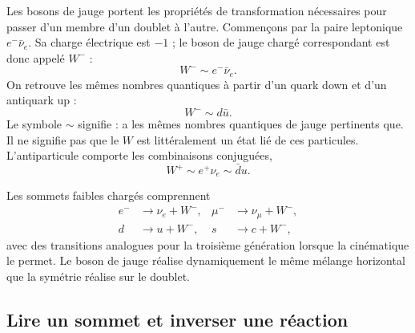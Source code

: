 Les bosons de jauge portent les propriétés de transformation nécessaires pour passer d’un membre d’un doublet à l’autre. Commençons par la paire leptonique \(e^-\bar\nu_e\). Sa charge électrique est \(-1\) ; le boson de jauge chargé correspondant est donc appelé \(W^-\) :
\begin{equation}
W^-\sim e^-\bar\nu_e.
\end{equation}
On retrouve les mêmes nombres quantiques à partir d’un quark down et d’un antiquark up :
\begin{equation}
W^-\sim d\bar u.
\end{equation}
Le symbole \(\sim\) signifie : a les mêmes nombres quantiques de jauge pertinents que. Il ne signifie pas que le \(W\) est littéralement un état lié de ces particules. L’antiparticule comporte les combinaisons conjuguées,
\begin{equation}
W^+\sim e^+\nu_e\sim\bar d u.
\end{equation}

Les sommets faibles chargés comprennent
\begin{align}
e^-&\longrightarrow\nu_e+W^-,
&
\mu^-&\longrightarrow\nu_\mu+W^-,
\label{eq:l5-lepton-w}\\
d&\longrightarrow u+W^-,
&
s&\longrightarrow c+W^-,
\label{eq:l5-quark-w}
\end{align}
avec des transitions analogues pour la troisième génération lorsque la cinématique le permet. Le boson de jauge réalise dynamiquement le même mélange horizontal que la symétrie réalise sur le doublet.

\begin{classroomqa}\end{classroomqa}

\subsection{Lire un sommet et inverser une réaction}

